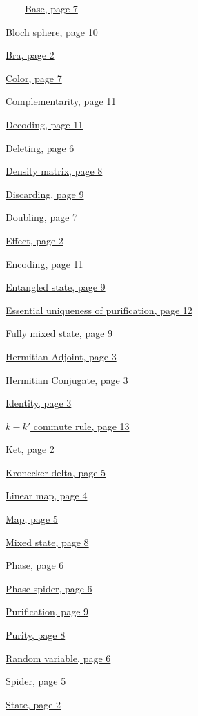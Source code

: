 \documentclass[]{article}
\begin{document}
~~~~\hyperref[coloursandbases]{Base, page 7}

\hyperref[section:basisandphasetranslations]{Bloch sphere, page 10}

\hyperref[braandket]{Bra, page 2}

\hyperref[coloursandbases]{Color, page 7}

\hyperref[complementarity]{Complementarity, page 11}

\hyperref[encodingdecoding]{Decoding, page 11}

\hyperref[spiders]{Deleting, page 6}

\hyperref[doubling]{Density matrix, page 8}

\hyperref[discarding]{Discarding, page 9}

\hyperref[doubling]{Doubling, page 7}

\hyperref[braandket]{Effect, page 2}

\hyperref[encodingdecoding]{Encoding, page 11}

\hyperref[entanglement]{Entangled state, page 9}

\hyperref[section:essentialuniqueness]{Essential uniqueness of purification, page 12}

\hyperref[discarding]{Fully mixed state, page 9}

\hyperref[braandket]{Hermitian Adjoint, page 3}

\hyperref[braandket]{Hermitian Conjugate, page 3}

\hyperref[identity]{Identity, page 3}

\hyperref[section:kkcommute]{$k-k'$ commute rule, page 13}

\hyperref[braandket]{Ket, page 2}

\hyperref[spiders]{Kronecker delta, page 5}

\hyperref[maps]{Linear map, page 4}

\hyperref[maps]{Map, page 5}

\hyperref[doubling]{Mixed state, page 8}

\hyperref[phasespiders]{Phase, page 6}

\hyperref[phasespiders]{Phase spider, page 6}

\hyperref[discarding]{Purification, page 9}

\hyperref[doubling]{Purity, page 8}

\hyperref[spiders]{Random variable, page 6}

\hyperref[spiders]{Spider, page 5}

\hyperref[braandket]{State, page 2}
\end{document}
